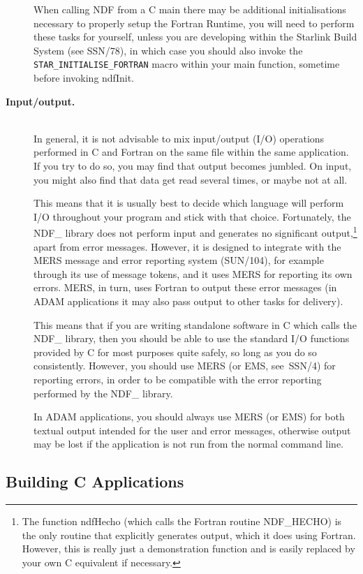 \documentclass[twoside,11pt]{article}
\newcommand{\xref}[3]{#1}
\newcommand{\xlabel}[1]{}
\begin{document}
\begin{description}
When calling NDF from a C main there may be additional initialisations
necessary to properly setup the Fortran Runtime, you will need to perform
these tasks for yourself, unless you are developing within the Starlink Build
System (see \xref{SSN/78}{ssn78}{}), in which case you should also invoke the 
\texttt{STAR\_INITIALISE\_FORTRAN} macro within your main function, sometime
before invoking ndfInit.

\item[{\bf{Input/output.}}]\mbox{}\\
In general, it is not advisable to mix input/output (I/O) operations
performed in C and Fortran on the same file within the same
application.  If you try to do so, you may find that output becomes
jumbled. On input, you might also find that data get read several
times, or maybe not at all.

This means that it is usually best to decide which language will
perform I/O throughout your program and stick with that
choice. Fortunately, the NDF\_ library does not perform input and
generates no significant output,\footnote{The function ndfHecho (which
calls the Fortran routine NDF\_HECHO) is the only routine that
explicitly generates output, which it does using Fortran. However,
this is really just a demonstration function and is easily replaced by
your own C equivalent if necessary.} apart from error
messages. However, it is designed to integrate with the MERS message
and error reporting system (\xref{SUN/104}{sun104}{}), for example
through its use of message tokens, and it uses MERS for reporting its
own errors. MERS, in turn, uses Fortran to output these error messages
(in \xref{ADAM}{sg4}{} applications it may also pass output to other
tasks for delivery).

This means that if you are writing standalone software in C which
calls the NDF\_ library, then you should be able to use the standard
I/O functions provided by C for most purposes quite safely, so long as
you do so consistently. However, you should use MERS (or EMS,
see~\xref{SSN/4}{ssn4}{}) for reporting errors, in order to be
compatible with the error reporting performed by the NDF\_ library.

In ADAM applications, you should always use MERS (or EMS) for both
textual output intended for the user and error messages, otherwise
output may be lost if the application is not run from the normal
command line.
\end{description}

\subsection{\xlabel{building_c_applications}Building C Applications}
\end{document}
